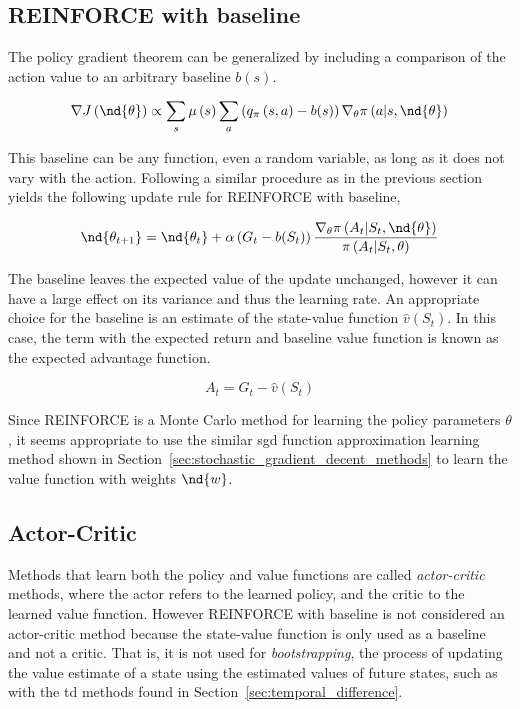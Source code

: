\subsection{REINFORCE with baseline}
The policy gradient theorem can be generalized by including a comparison of the action value to an arbitrary baseline $b(s)$. 

\begin{equation}
  \nabla J\left(\nd{\theta}\right) \propto \sum_s \mu \left(s\right) \sum_a \left(q_\pi\left(s, a\right) - b(s)\right) \nabla_\theta \pi\left(a|s, \nd{\theta}\right)
  \label{eq:pgt_b}
\end{equation}

This baseline can be any function, even a random variable, as long as it does not vary with the action\cite{sutton2018reinforcement}. Following a similar procedure as in the previous section yields the following update rule for REINFORCE with baseline,

\begin{equation}
  \nd{\theta_{t+1}} = \nd{\theta_t} + \alpha \left(G_t - b(S_t)\right) \frac{\nabla_\theta \pi\left(A_t|S_t, \nd{\theta}\right)}{\pi\left(A_t|S_t,\theta\right)}
  \label{eq:reinforce_baseline}
\end{equation}

The baseline leaves the expected value of the update unchanged, however it can have a large effect on its variance and thus the learning rate. An appropriate choice for the baseline is an estimate of the state-value function $\hat{v}\left(S_t\right)$\cite{sutton2018reinforcement}. In this case, the term with the expected return and baseline value function is known as the expected advantage function.

\begin{equation}
  A_t=G_t-\hat{v}(S_t)
\end{equation}

Since REINFORCE is a Monte Carlo method for learning the policy parameters $\theta$, it seems appropriate to use the similar \acrfull{sgd} function approximation learning method shown in Section~\ref{sec:stochastic_gradient_decent_methods} to learn the value function with weights $\nd{w}$.

\subsection{Actor-Critic}
Methods that learn both the policy and value functions are called \emph{actor-critic} methods, where the actor refers to the learned policy, and the critic to the learned value function. However REINFORCE with baseline is not considered an actor-critic method because the state-value function is only used as a baseline and not a critic. That is, it is not used for \emph{bootstrapping}, the process of updating the value estimate of a state using the estimated values of future states, such as with the \acrfull{td} methods found in Section~\ref{sec:temporal_difference}.

